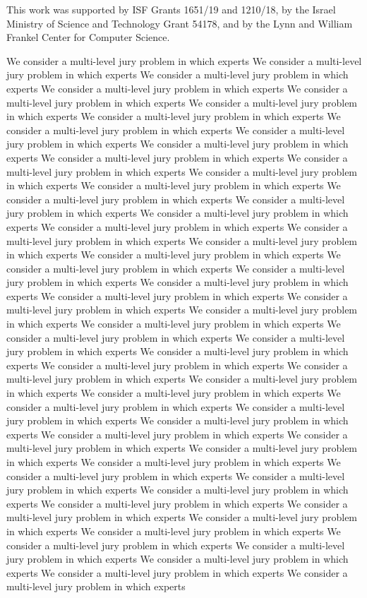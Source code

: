 \documentclass[letterpaper]{article} %
\theoremstyle{definition}
\begin{document}
  This work was supported by ISF Grants 1651/19 and 1210/18, by the Israel Ministry of Science and Technology Grant 54178, and by the Lynn and William Frankel Center for Computer Science.

We consider a multi-level jury problem in which experts
We consider a multi-level jury problem in which experts
We consider a multi-level jury problem in which experts
We consider a multi-level jury problem in which experts
We consider a multi-level jury problem in which experts
We consider a multi-level jury problem in which experts
We consider a multi-level jury problem in which experts
We consider a multi-level jury problem in which experts
We consider a multi-level jury problem in which experts
We consider a multi-level jury problem in which experts
We consider a multi-level jury problem in which experts
We consider a multi-level jury problem in which experts
We consider a multi-level jury problem in which experts
We consider a multi-level jury problem in which experts
We consider a multi-level jury problem in which experts
We consider a multi-level jury problem in which experts
We consider a multi-level jury problem in which experts
We consider a multi-level jury problem in which experts
We consider a multi-level jury problem in which experts
We consider a multi-level jury problem in which experts
We consider a multi-level jury problem in which experts
We consider a multi-level jury problem in which experts
We consider a multi-level jury problem in which experts
We consider a multi-level jury problem in which experts
We consider a multi-level jury problem in which experts
We consider a multi-level jury problem in which experts
We consider a multi-level jury problem in which experts
We consider a multi-level jury problem in which experts
We consider a multi-level jury problem in which experts
We consider a multi-level jury problem in which experts
We consider a multi-level jury problem in which experts
We consider a multi-level jury problem in which experts
We consider a multi-level jury problem in which experts
We consider a multi-level jury problem in which experts
We consider a multi-level jury problem in which experts
We consider a multi-level jury problem in which experts
We consider a multi-level jury problem in which experts
We consider a multi-level jury problem in which experts
We consider a multi-level jury problem in which experts
We consider a multi-level jury problem in which experts
We consider a multi-level jury problem in which experts
We consider a multi-level jury problem in which experts
We consider a multi-level jury problem in which experts
We consider a multi-level jury problem in which experts
We consider a multi-level jury problem in which experts
We consider a multi-level jury problem in which experts
We consider a multi-level jury problem in which experts
We consider a multi-level jury problem in which experts
We consider a multi-level jury problem in which experts
We consider a multi-level jury problem in which experts
We consider a multi-level jury problem in which experts
We consider a multi-level jury problem in which experts
We consider a multi-level jury problem in which experts
We consider a multi-level jury problem in which experts
\clearpage

\end{document}
